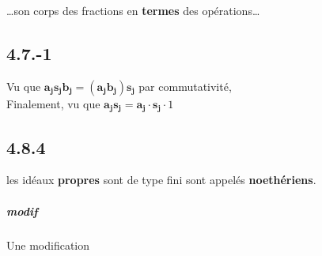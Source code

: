 \documentclass[11pt]{article}
\begin{document}
\dots son corps des fractions en \textbf{termes} des opérations\dots

\subsection*{4.7.-1}
Vu que $\pmb{a_js_jb_j = (a_jb_j)s_j}$ par commutativité, 
\\
 Finalement, vu que $\pmb{a_js_j = a_j \cdot s_j} \cdot 1$

\subsection*{4.8.4}

 les idéaux \textbf{propres} sont de type fini sont appelés \textbf{noethériens}.
 
\subparagraph{modif}
Une modification


 	
\end{document}

